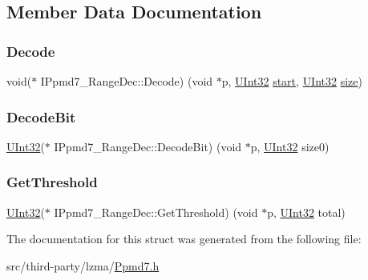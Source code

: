 \subsection{Member Data Documentation}
\mbox{\label{struct_i_ppmd7___range_dec_a13592ecebdba36f037c80f30dfc32fa8}} 
\subsubsection{\texorpdfstring{Decode}{Decode}}
{\footnotesize\ttfamily void($\ast$ I\+Ppmd7\+\_\+\+Range\+Dec\+::\+Decode) (void $\ast$p, \mbox{\hyperlink{7z_types_8h_a4cd0dc7d33ac7a69204e8429ecea0f86}{U\+Int32}} \mbox{\hyperlink{tarith_8c_a7b8af9b9d992acd1d81caf9bb377f6c2a0e97c69c73117f6c0109b2d7d1d9cedc}{start}}, \mbox{\hyperlink{7z_types_8h_a4cd0dc7d33ac7a69204e8429ecea0f86}{U\+Int32}} \mbox{\hyperlink{ioapi_8h_a014d89bd76f74ef3a29c8f04b473eb76}{size}})}

\mbox{\label{struct_i_ppmd7___range_dec_a7878283025da7a71f5de9ce182e80b52}} 
\subsubsection{\texorpdfstring{Decode\+Bit}{DecodeBit}}
{\footnotesize\ttfamily \mbox{\hyperlink{7z_types_8h_a4cd0dc7d33ac7a69204e8429ecea0f86}{U\+Int32}}($\ast$ I\+Ppmd7\+\_\+\+Range\+Dec\+::\+Decode\+Bit) (void $\ast$p, \mbox{\hyperlink{7z_types_8h_a4cd0dc7d33ac7a69204e8429ecea0f86}{U\+Int32}} size0)}

\mbox{\label{struct_i_ppmd7___range_dec_ab77e257cd8bf249a96a1dfaa2ddfd341}} 
\subsubsection{\texorpdfstring{Get\+Threshold}{GetThreshold}}
{\footnotesize\ttfamily \mbox{\hyperlink{7z_types_8h_a4cd0dc7d33ac7a69204e8429ecea0f86}{U\+Int32}}($\ast$ I\+Ppmd7\+\_\+\+Range\+Dec\+::\+Get\+Threshold) (void $\ast$p, \mbox{\hyperlink{7z_types_8h_a4cd0dc7d33ac7a69204e8429ecea0f86}{U\+Int32}} total)}



The documentation for this struct was generated from the following file\+:\begin{DoxyCompactItemize}
\item 
src/third-\/party/lzma/\mbox{\hyperlink{_ppmd7_8h}{Ppmd7.\+h}}\end{DoxyCompactItemize}
